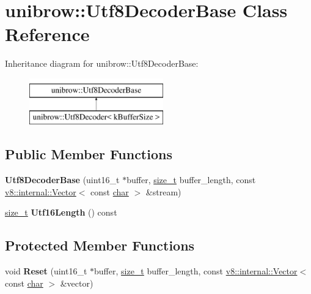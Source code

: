 \hypertarget{classunibrow_1_1Utf8DecoderBase}{}\section{unibrow\+:\+:Utf8\+Decoder\+Base Class Reference}
\label{classunibrow_1_1Utf8DecoderBase}
Inheritance diagram for unibrow\+:\+:Utf8\+Decoder\+Base\+:\begin{figure}[H]
\begin{center}
\leavevmode
\includegraphics[height=2.000000cm]{classunibrow_1_1Utf8DecoderBase}
\end{center}
\end{figure}
\subsection*{Public Member Functions}
\begin{DoxyCompactItemize}
\item 
\mbox{\label{classunibrow_1_1Utf8DecoderBase_a6ffb91ddfaf226253e2426daa120843b}} 
{\bfseries Utf8\+Decoder\+Base} (uint16\+\_\+t $\ast$buffer, \mbox{\hyperlink{classsize__t}{size\+\_\+t}} buffer\+\_\+length, const \mbox{\hyperlink{classv8_1_1internal_1_1Vector}{v8\+::internal\+::\+Vector}}$<$ const \mbox{\hyperlink{classchar}{char}} $>$ \&stream)
\item 
\mbox{\label{classunibrow_1_1Utf8DecoderBase_a4528cc193ee051a4d94cc4eb4681a97a}} 
\mbox{\hyperlink{classsize__t}{size\+\_\+t}} {\bfseries Utf16\+Length} () const
\end{DoxyCompactItemize}
\subsection*{Protected Member Functions}
\begin{DoxyCompactItemize}
\item 
\mbox{\label{classunibrow_1_1Utf8DecoderBase_a60fb8fd30b69bb167299c30c36c62220}} 
void {\bfseries Reset} (uint16\+\_\+t $\ast$buffer, \mbox{\hyperlink{classsize__t}{size\+\_\+t}} buffer\+\_\+length, const \mbox{\hyperlink{classv8_1_1internal_1_1Vector}{v8\+::internal\+::\+Vector}}$<$ const \mbox{\hyperlink{classchar}{char}} $>$ \&vector)
\end{DoxyCompactItemize}
